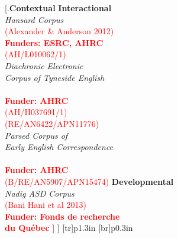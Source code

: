 \documentclass[11pt]{article}
\begin{document}
	[.{\textbf{Contextual}} {\textbf{Interactional}\vspace{1mm}\\
		\textsl{Hansard Corpus}\\
		\textcolor{red}{(Alexander \& Anderson 2012)}\\
		\textcolor{red}{\textbf{Funders: ESRC, AHRC}}\\
		\textcolor{red}{(AH/L010062/1)}\vspace{2mm}\\
		\textsl{Diachronic Electronic}\\ 
		\textsl{Corpus of Tyneside English}\\
		\textcolor{red}{\citep{decte}}\\
		\textcolor{red}{\textbf{Funder: AHRC}}\\
		\textcolor{red}{(AH/H037691/1)}\\\textcolor{red}{(RE/AN6422/APN11776)}\vspace{2mm}\\
		\textsl{Parsed Corpus of }\\
		\textsl{Early English Correspondence}\\
		\textcolor{red}{\citep{pceec}}\\
		\textcolor{red}{\textbf{Funder: AHRC}}\\
		\textcolor{red}{(B/RE/AN5907/APN15474)}
	} 
	{\textbf{Developmental}\vspace{1mm}\\
		\textsl{Nadig ASD Corpus}\\
		\textcolor{red}{(Bani Hani et al 2013)}\\
		\textcolor{red}{\textbf{Funder: Fonds de recherche}}\\
		\textcolor{red}{\textbf{du Québec}}
	} ] ]
	{\makedash{1pt}[tr]{p1}{.3in}}
	{\makedash{1pt}[br]{p0}{.3in}}






\end{document}
